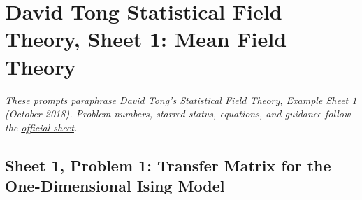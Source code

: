 \section{David Tong Statistical Field Theory, Sheet 1: Mean Field Theory}

\noindent\textit{These prompts paraphrase David Tong's \emph{Statistical Field Theory},
Example Sheet 1 (October 2018). Problem numbers, starred status, equations, and
guidance follow the \href{https://davidtong.org/pdfs/teaching/statistical-field-theory/99a.pdf}{official sheet}.}

\subsection{Sheet 1, Problem 1: Transfer Matrix for the One-Dimensional Ising Model}

